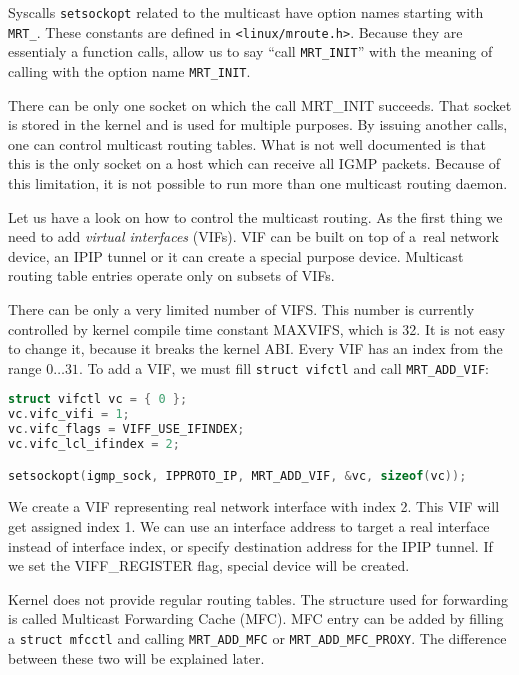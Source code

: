 Syscalls \texttt{setsockopt} related to the multicast have option names starting
with \texttt{MRT\_}. These constants are defined in \texttt{<linux/mroute.h>}.
Because they are essentialy a function calls, allow us to say ``call
\texttt{MRT\_INIT}'' with the meaning of calling \setsockopt with the option
name \texttt{MRT\_INIT}.

There can be only one socket on which the call MRT\_INIT succeeds. That socket
is stored in the kernel and is used for multiple purposes. By issuing another
\setsockopt calls, one can control multicast routing tables. What is not well
documented is that this is the only socket on a host which can receive all IGMP
packets. Because of this limitation, it is not possible to run more than one
multicast routing daemon.

Let us have a look on how to control the multicast routing. As the first thing
we need to add \emph{virtual interfaces} (VIFs). VIF can be built on top of
a~real network device, an IPIP tunnel or it can create a special purpose device.
Multicast routing table entries operate only on subsets of VIFs.

There can be only a very limited number of VIFS. This number is currently
controlled by kernel compile time constant MAXVIFS, which is 32. It is not easy
to change it, because it breaks the kernel ABI. Every VIF has an index from the
range $0\dots31$. To add a VIF, we must fill \texttt{struct vifctl} and call
\texttt{MRT\_ADD\_VIF}:

\begin{lstlisting}[language=c]
struct vifctl vc = { 0 };
vc.vifc_vifi = 1;
vc.vifc_flags = VIFF_USE_IFINDEX;
vc.vifc_lcl_ifindex = 2;

setsockopt(igmp_sock, IPPROTO_IP, MRT_ADD_VIF, &vc, sizeof(vc));
\end{lstlisting}

We create a VIF representing real network interface with index 2. This VIF will
get assigned index 1. We can use an interface address to target a real
interface instead of interface index, or specify destination address for the
IPIP tunnel. If we set the VIFF\_REGISTER flag, special device will be created.

Kernel does not provide regular routing tables. The structure used for
forwarding is called Multicast Forwarding Cache (MFC). MFC entry can be added
by filling a \texttt{struct mfcctl} and calling \texttt{MRT\_ADD\_MFC} or
\texttt{MRT\_ADD\_MFC\_PROXY}. The difference between these two will be
explained later.

